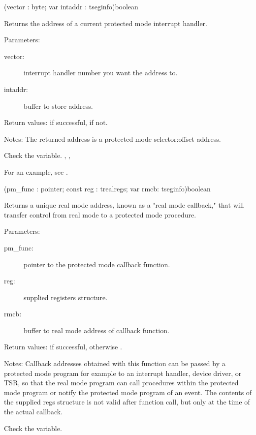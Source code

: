 {(vector : byte; var intaddr : tseginfo)}{boolean}
{Returns the address of a current protected mode interrupt handler.

Parameters:
\begin{description}
\item[vector:\ ] interrupt handler number you want the address to.
\item[intaddr:\ ] buffer to store address.
\end{description}

Return values:  if successful,  if not.

Notes: The returned address is a protected mode selector:offset address.
}
{ Check the  variable.}
{ ,
,  }

For an example, see .

{(pm\_func : pointer; const reg : trealregs; var rmcb: tseginfo)}{boolean}
{
Returns a unique real mode  address, known as a "real mode
callback," that will transfer control from real mode to a protected mode
procedure.

Parameters:
\begin{description}
\item[pm\_func:\ ]  pointer to the protected mode callback function.
\item[reg:\ ] supplied registers structure.
\item[rmcb:\ ] buffer to real mode address of callback function.
\end{description}

Return values:  if successful, otherwise .

Notes: Callback addresses obtained with this function can be passed by a
protected mode program for example to an interrupt handler, device driver,
or TSR, so that the real mode program can call procedures within the
protected mode program or notify the protected mode program of an event. The
contents of the supplied regs structure is not valid after function call,
but only at the time of the actual callback.
}{Check the  variable.}
{ }

\html{}

